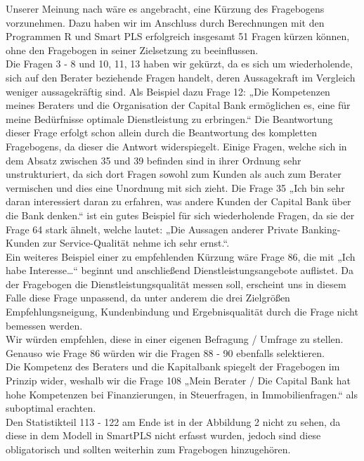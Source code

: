 \documentclass{article}\usepackage[]{graphicx}\usepackage[]{color}
\begin{document}

\label{fragebogen}




Unserer Meinung nach wäre es angebracht, eine Kürzung des Fragebogens vorzunehmen. Dazu haben wir im Anschluss durch Berechnungen mit den Programmen R und Smart PLS erfolgreich insgesamt 51 Fragen kürzen können, ohne den Fragebogen in seiner Zielsetzung zu beeinflussen.\\
Die Fragen 3 - 8 und 10, 11, 13 haben wir gekürzt, da es sich um wiederholende, sich auf den Berater beziehende Fragen handelt, deren Aussagekraft im Vergleich weniger aussagekräftig sind. Als Beispiel dazu Frage 12: „Die Kompetenzen meines Beraters und die Organisation der Capital Bank ermöglichen es, eine für meine Bedürfnisse optimale Dienstleistung zu erbringen.“ Die Beantwortung dieser Frage erfolgt schon allein durch die Beantwortung des kompletten Fragebogens, da dieser die Antwort widerspiegelt. Einige Fragen, welche sich in dem Absatz zwischen 35 und 39 befinden sind in ihrer Ordnung sehr unstrukturiert, da sich dort Fragen sowohl zum Kunden als auch zum Berater vermischen und dies eine Unordnung mit sich zieht. Die Frage 35 „Ich bin sehr daran interessiert daran zu erfahren, was andere Kunden der Capital Bank über die Bank denken.“ ist ein gutes Beispiel für sich wiederholende Fragen, da sie der Frage 64 stark ähnelt, welche lautet: „Die Aussagen anderer Private Banking-Kunden zur Service-Qualität nehme ich sehr ernst.“.\\
Ein weiteres Beispiel einer zu empfehlenden Kürzung wäre Frage 86, die mit „Ich habe Interesse…“ beginnt und anschließend Dienstleistungsangebote auflistet. Da der Fragebogen die Dienstleistungsqualität messen soll, erscheint uns in diesem Falle diese Frage unpassend, da unter anderem die drei Zielgrößen Empfehlungsneigung, Kundenbindung und Ergebnisqualität durch die Frage nicht bemessen werden.\\
Wir würden empfehlen, diese in einer eigenen Befragung / Umfrage zu stellen. Genauso wie Frage 86 würden wir die Fragen 88 - 90 ebenfalls selektieren.\\
Die Kompetenz des Beraters und die Kapitalbank spiegelt der Fragebogen im Prinzip wider, weshalb wir die Frage 108 „Mein Berater / Die Capital Bank hat hohe Kompetenzen bei Finanzierungen, in Steuerfragen, in Immobilienfragen.“ als suboptimal erachten.\\
Den Statistikteil 113 - 122 am Ende ist in der Abbildung 2 nicht zu sehen, da diese in dem Modell in SmartPLS nicht erfasst wurden, jedoch sind diese obligatorisch und sollten weiterhin zum Fragebogen hinzugehören.\\
\end{document}
